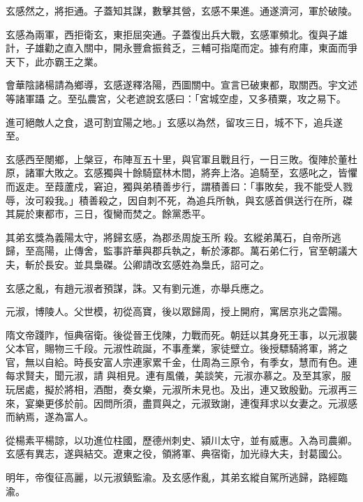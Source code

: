 \begin{pinyinscope}
 玄感然之，將拒通。子蓋知其謀，數擊其營，玄感不果進。通遂濟河，軍於破陵。



 玄感為兩軍，西拒衛玄，東拒屈突通。子蓋復出兵大戰，玄感軍頻北。復與子雄計，子雄勸之直入關中，開永豐倉振貧乏，三輔可指麾而定。據有府庫，東面而爭天下，此亦霸王之業。



 會華陰諸楊請為鄉導，玄感遂釋洛陽，西圖關中。宣言已破東都，取關西。宇文述等諸軍躡
 之。至弘農宮，父老遮說玄感曰：「宮城空虛，又多積粟，攻之易下。



 進可絕敵人之食，退可割宜陽之地。」玄感以為然，留攻三日，城不下，追兵遂至。



 玄感西至閿鄉，上槃豆，布陣亙五十里，與官軍且戰且行，一日三敗。復陣於董杜原，諸軍大敗之。玄感獨與十餘騎竄林木間，將奔上洛。追騎至，玄感叱之，皆懼而返走。至葭蘆戍，窘迫，獨與弟積善步行，謂積善曰：「事敗矣，我不能受人戮辱，汝可殺我。」積善殺之，因自刺不死，為追兵所執，與玄感首俱送行在所，磔其屍於東都市，三日，復臠而焚之。餘黨悉平。



 其弟玄獎為義陽太守，將歸玄感，為郡丞周旋玉所
 殺。玄縱弟萬石，自帝所逃歸，至高陽，止傳舍，監事許華與郡兵執之，斬於涿郡。萬石弟仁行，官至朝議大夫，斬於長安。並具梟磔。公卿請改玄感姓為梟氏，詔可之。



 玄感之亂，有趙元淑者預謀，誅。又有劉元進，亦舉兵應之。



 元淑，博陵人。父世模，初從高寶，後以眾歸周，授上開府，寓居京兆之雲陽。



 隋文帝踐阼，恒典宿衛。後從晉王伐陳，力戰而死。朝廷以其身死王事，以元淑襲父本官，賜物三千段。元淑性疏誕，不事產業，家徒壁立。後授驃騎將軍，將之官，無以自給。時長安富人宗連家累千金，仕周為三原令，有季女，慧而有色。連每求賢夫，聞元淑，請
 與相見。連有風儀，美談笑，元淑亦慕之。及至其家，服玩居處，擬於將相，酒酣，奏女樂，元淑所未見也。及出，連又致殷勤。元淑再三來，宴樂更侈於前。因問所須，盡買與之，元淑致謝，連復拜求以女妻之。元淑感而納焉，遂為富人。



 從楊素平楊諒，以功進位柱國，歷德州刺史、潁川太守，並有威惠。入為司農卿。玄感有異志，遂與結交。遼東之役，領將軍、典宿衛，加光祿大夫，封葛國公。



 明年，帝復征高麗，以元淑鎮監渝。及玄感作亂，其弟玄縱自駕所逃歸，路經臨渝。




\end{pinyinscope}
